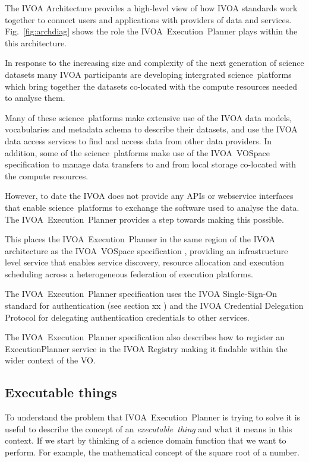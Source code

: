 \documentclass[11pt,a4paper]{ivoa}
\newcommand{\webservice} {webservice\xspace}
\newcommand{\ivoa} {IVOA\xspace}
\newcommand{\ivoavospace} {IVOA~VOSpace\xspace}
\newcommand{\execplanner} {ExecutionPlanner\xspace}
\newcommand{\ivoaexecplanner} {IVOA~Execution~Planner\xspace}
\newcommand{\dataset} {dataset\xspace}
\newcommand{\scienceplatform} {science~platform\xspace}
\newcommand{\executablething}  {\textit{executable~thing}\xspace}
\begin{document}
The IVOA Architecture \citep{2010ivoa.rept.1123A} provides a high-level view of how IVOA
standards work together to connect users and applications with providers of data
and services.
Fig.~\ref{fig:archdiag} shows the role the \ivoaexecplanner plays within the this architecture.

In response to the increasing size and complexity of the next generation of science \dataset{}s
many \ivoa participants are developing intergrated \scienceplatform{}s which bring
together the \dataset{}s co-located with the compute resources needed to analyse them.

Many of these \scienceplatform{}s make extensive use of the \ivoa data models,
vocabularies and metadata schema to describe their \dataset{}s,
and use the \ivoa data access services to find and access data from other data providers.
In addition, some of the \scienceplatform{}s make use of the \ivoavospace specification
to manage data transfers to and from local storage co-located with the compute resources.

However, to date the \ivoa does not provide any APIs or \webservice interfaces that
enable \scienceplatform{}s to exchange the software used to analyse the data.
The \ivoaexecplanner provides a step towards making this possible.

This places the \ivoaexecplanner in the same region of the \ivoa architecture
as the \ivoavospace specification \citep{2009ivoa.specQ1007G},
providing an infrastructure level service that enables service discovery,
resource allocation and execution scheduling across a heterogeneous federation
of execution platforms.

The \ivoaexecplanner specification uses the
\ivoa Single-Sign-On standard \citep{2017ivoa.spec.0524T}
for authentication (see section xx )%
and the
\ivoa Credential Delegation Protocol \citep{2010ivoa.spec.0218P}
for delegating authentication credentials to other services.

The \ivoaexecplanner specification also describes how to register
an \execplanner service in the
\ivoa Registry \citep{2009ivoa.spec.1104B}
making it findable within the wider context of the VO.

\subsection{Executable things}
\label{subsec:executablething}

To understand the problem that \ivoaexecplanner is trying to solve
it is useful to describe the concept of an \executablething and what it means in this context.
If we start by thinking of a science domain function that we want to perform.
For example, the mathematical concept of the square root of a number.
\end{document}

